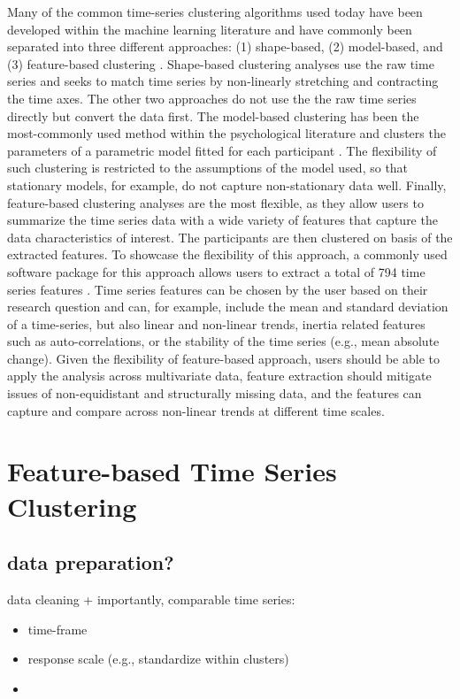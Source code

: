 \documentclass[man, 12pt, a4paper]{apa7}
\theoremstyle{break}
\theoremstyle{plain}
\begin{document}
Many of the common time-series clustering algorithms used today have been developed within the machine learning literature and have commonly been separated into three different approaches: (1) shape-based, (2) model-based, and (3) feature-based clustering \citep{hautamaki2008, liao2005}. Shape-based clustering analyses use the raw time series and seeks to match time series by non-linearly stretching and contracting the time axes. The other two approaches do not use the the raw time series directly but convert the data first. The model-based clustering has been the most-commonly used method within the psychological literature and clusters the parameters of a parametric model fitted for each participant \citep[e.g.,][]{ernst2021}. The flexibility of such clustering is restricted to the assumptions of the model used, so that stationary models, for example, do not capture non-stationary data well. Finally, feature-based clustering analyses are the most flexible, as they allow users to summarize the time series data with a wide variety of features that capture the data characteristics of interest. The participants are then clustered on basis of the extracted features. To showcase the flexibility of this approach, a commonly used software package for this approach allows users to extract a total of 794 time series features \citep[][]{christ2018}. Time series features can be chosen by the user based on their research question and can, for example, include the mean and standard deviation of a time-series, but also linear and non-linear trends, inertia related features such as auto-correlations, or the stability of the time series (e.g., mean absolute change). Given the flexibility of feature-based approach, users should be able to apply the analysis across multivariate data, feature extraction should mitigate issues of non-equidistant and structurally missing data, and the features can capture and compare across non-linear trends at different time scales.

\section{Feature-based Time Series Clustering}

\subsection{data preparation?}
data cleaning + importantly, comparable time series:
\begin{itemize}[noitemsep]
    \item time-frame
    \item response scale (e.g., standardize within clusters)
    \item 
\end{itemize}
\end{document}
